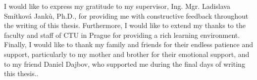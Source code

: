 
\begin{acknowledgmentpage}

I would like to express my gratitude to my supervisor, Ing. Mgr. Ladislava Smítková Janků, Ph.D., for providing me with constructive feedback throughout the writing of this thesis. Furthermore, I would like to extend my thanks to the faculty and staff of CTU in Prague for providing a rich learning environment. Finally, I would like to thank my family and friends for their endless patience and support, particularly to my mother and brother for their emotional support, and to my friend Daniel Dajbov, who supported me during the final days of writing this thesis..


\end{acknowledgmentpage} 

